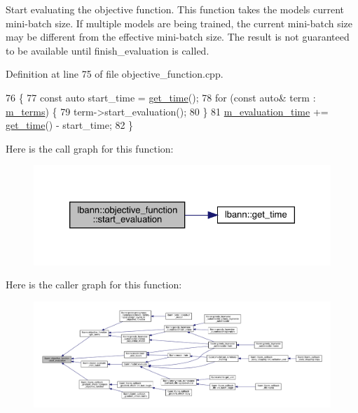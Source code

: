 Start evaluating the objective function. This function takes the model\textquotesingle{}s current mini-\/batch size. If multiple models are being trained, the current mini-\/batch size may be different from the effective mini-\/batch size. The result is not guaranteed to be available until finish\+\_\+evaluation is called. 

Definition at line 75 of file objective\+\_\+function.\+cpp.


\begin{DoxyCode}
76                                                                \{
77   \textcolor{keyword}{const} \textcolor{keyword}{auto} start\_time = \hyperlink{namespacelbann_a478d36031ff0659893c4322cd856157f}{get\_time}();
78   \textcolor{keywordflow}{for} (\textcolor{keyword}{const} \textcolor{keyword}{auto}& term : \hyperlink{classlbann_1_1objective__function_aea9c1f90ba9af1b1330efa2ba6adb5e2}{m\_terms}) \{
79     term->start\_evaluation();
80   \}
81   \hyperlink{classlbann_1_1objective__function_a9ef17c7204cd371261c9c083d86de91a}{m\_evaluation\_time} += \hyperlink{namespacelbann_a478d36031ff0659893c4322cd856157f}{get\_time}() - start\_time;
82 \}
\end{DoxyCode}
Here is the call graph for this function\+:\nopagebreak
\begin{figure}[H]
\begin{center}
\leavevmode
\includegraphics[width=326pt]{classlbann_1_1objective__function_a3edb6708894d31ec2a014c6eb8a61df2_cgraph}
\end{center}
\end{figure}
Here is the caller graph for this function\+:\nopagebreak
\begin{figure}[H]
\begin{center}
\leavevmode
\includegraphics[width=350pt]{classlbann_1_1objective__function_a3edb6708894d31ec2a014c6eb8a61df2_icgraph}
\end{center}
\end{figure}


